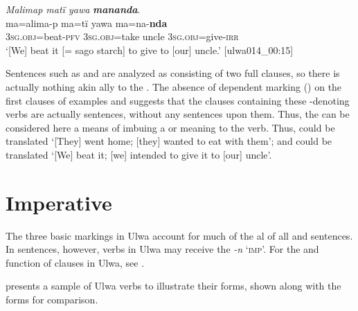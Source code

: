 \ea%
    \label{ex:verbs:40}
          \textit{Malimap matï yawa} \textbf{\textit{mananda}}.\\
\gll  ma=alima-p    ma=tï      yawa  ma=na-\textbf{nda}\\
    3\textsc{sg.obj}=beat-\textsc{pfv}  \textsc{3sg.obj}=take  uncle  3\textsc{sg.obj}=give-\textsc{irr}\\
\glt `[We] beat it [= sago starch] to give to [our] uncle.’ [ulwa014\_00:15]
\z

Sentences such as  and  are analyzed as consisting of two full clauses, so there is actually nothing akin ally to the  . The absence of  dependent marking () on the first clauses of examples  and  suggests that the clauses containing these -denoting  verbs are actually  sentences, without any sentences  upon them. Thus, the   can be considered here a means of imbuing a  or  meaning to the verb. Thus,  could be translated ‘[They] went home; [they] wanted to eat with them’; and  could be translated ‘[We] beat it; [we] intended to give it to [our] uncle’.


\section{Imperative}\label{sec:4.7}


The three basic  markings in Ulwa account for much of the al  of all  and  sentences. In  sentences, however, verbs in Ulwa may receive the   \textit{-n} ‘\textsc{imp}’. For the  and function of  clauses in Ulwa, see .

   presents a sample of Ulwa verbs to illustrate their  forms, shown along with the  forms for comparison.

